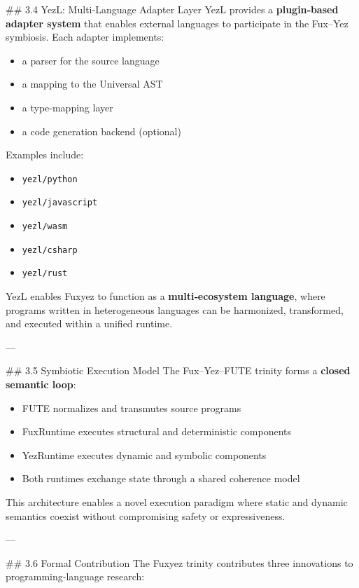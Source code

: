 \documentclass[12pt, a4paper]{book}
\begin{document}
\#\# 3.4 YezL: Multi‑Language Adapter Layer  
YezL provides a \textbf{plugin‑based adapter system} that enables external languages to participate in the Fux–Yez symbiosis. Each adapter implements:

\begin{itemize}
  \item a parser for the source language  
  \item a mapping to the Universal AST  
  \item a type‑mapping layer  
  \item a code generation backend (optional)  
\end{itemize}

Examples include:

\begin{itemize}
  \item \texttt{yezl/python}  
  \item \texttt{yezl/javascript}  
  \item \texttt{yezl/wasm}  
  \item \texttt{yezl/csharp}  
  \item \texttt{yezl/rust}  
\end{itemize}

YezL enables Fuxyez to function as a \textbf{multi‑ecosystem language}, where programs written in heterogeneous languages can be harmonized, transformed, and executed within a unified runtime.

---

\#\# 3.5 Symbiotic Execution Model  
The Fux–Yez–FUTE trinity forms a \textbf{closed semantic loop}:

\begin{itemize}
  \item FUTE normalizes and transmutes source programs  
  \item FuxRuntime executes structural and deterministic components  
  \item YezRuntime executes dynamic and symbolic components  
  \item Both runtimes exchange state through a shared coherence model  
\end{itemize}

This architecture enables a novel execution paradigm where static and dynamic semantics coexist without compromising safety or expressiveness.

---

\#\# 3.6 Formal Contribution  
The Fuxyez trinity contributes three innovations to programming‑language research:
\end{document}
